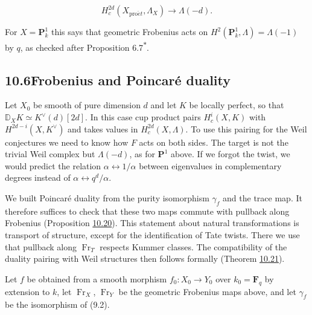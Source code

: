 \documentclass[11pt]{article}
\newcommand{\bpout}[1]{#1\textsuperscript{\hyperlink{bp-outside}{\ensuremath{\ast}}}}
\begin{document}
\[
H_c^{2d}(X_{\mathrm{pro}\acute{e}t},\Lambda_X)\longrightarrow\Lambda(-d).
\]

For \(X=\mathbf P^1_k\) this says that geometric Frobenius acts on \(H^2(\mathbf P^1_k,\Lambda)=\Lambda(-1)\) by \(q\), as checked after Proposition \bpout{6.7}.


\subsection*{\texorpdfstring{10.6\quad Frobenius and Poincaré duality}{10.6 Frobenius and Poincaré duality}}
\label{bp160}%
\label{bp161}%
Let \(X_0\) be smooth of pure dimension \(d\) and let \(K\) be locally perfect, so that \(\mathbb D_XK\simeq K^\vee(d)[2d]\). In this case cup product pairs \(H^i_c(X,K)\) with \(H^{2d-i}(X,K^\vee)\) and takes values in \(H^{2d}_c(X,\Lambda)\). To use this pairing for the Weil conjectures we need to know how \(F\) acts on both sides. The target is not the trivial Weil complex but \(\Lambda(-d)\), as for \(\mathbf P^1\) above. If we forgot the twist, we would predict the relation \(\alpha\leftrightarrow1/\alpha\) between eigenvalues in complementary degrees instead of \(\alpha\leftrightarrow q^d/\alpha\).

We built Poincaré duality from the purity isomorphism \(\gamma_f\) and the trace map. It therefore suffices to check that these two maps commute with pullback along Frobenius (Proposition \hyperref[bp162]{10.20}). This statement about natural transformations is transport of structure, except for the identification of Tate twists. There we use that pullback along \(\operatorname{Fr}_T\) respects Kummer classes. The compatibility of the duality pairing with Weil structures then follows formally (Theorem \hyperref[bp165]{10.21}).

Let \(f\) be obtained from a smooth morphism \(f_0:X_0\to Y_0\) over \(k_0=\mathbf F_q\) by extension to \(k\), let \(\operatorname{Fr}_X\), \(\operatorname{Fr}_Y\) be the geometric Frobenius maps above, and let \(\gamma_f\) be the isomorphism of (9.2).
\end{document}
